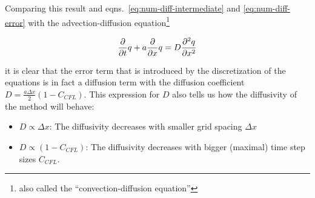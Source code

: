 Comparing this result and eqns.~\ref{eq:num-diff-intermediate} and \ref{eq:num-diff-error} with the
advection-diffusion equation\footnote{also called the ``convection-diffusion equation''}

\begin{align}
    \frac{\partial}{\partial t} q + a \frac{\partial}{\partial x} q = D \frac{\partial^2 q}{\partial x^2}  \label{eq:advection-diffusion}
\end{align}

it is clear that the error term that is introduced by the discretization of the equations is in
fact a diffusion term with the diffusion coefficient $D = \frac{a \Delta x}{2} \left( 1 - C_{CFL}
\right)$. This expression for $D$ also tells us how the diffusivity of the method will behave:

\begin{itemize}
 \item $D \propto \Delta x$: The diffusivity decreases with smaller grid spacing $\Delta x$
 \item $D \propto (1 - C_{CFL})$: The diffusivity decreases with bigger (maximal) time step sizes
    $C_{CFL}$.
\end{itemize}




